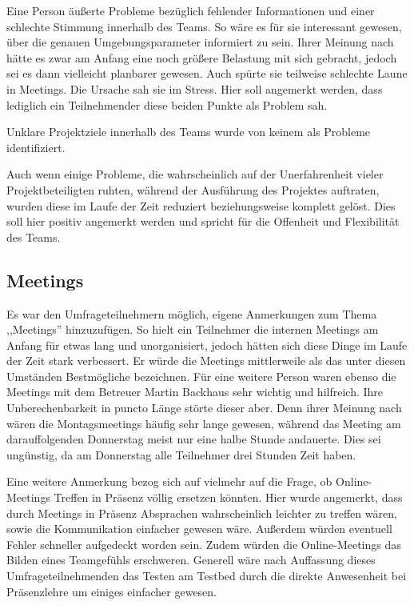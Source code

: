 \documentclass[../review_3.tex]{subfiles}
\begin{document}
Eine Person äußerte Probleme bezüglich fehlender Informationen und einer schlechte Stimmung innerhalb des Teams. So wäre es für sie interessant gewesen, über die genauen Umgebungsparameter informiert zu sein. Ihrer Meinung nach hätte es zwar am Anfang eine noch größere Belastung mit sich gebracht, jedoch sei es dann vielleicht planbarer gewesen. Auch spürte sie teilweise schlechte Laune in Meetings. Die Ursache sah sie im Stress. Hier soll angemerkt werden, dass lediglich ein Teilnehmender diese beiden Punkte als Problem sah.

Unklare Projektziele innerhalb des Teams wurde von keinem als Probleme identifiziert.

Auch wenn einige Probleme, die wahrscheinlich auf der Unerfahrenheit vieler Projektbeteiligten ruhten, während der Ausführung des Projektes auftraten, wurden diese im Laufe der Zeit reduziert beziehungsweise komplett gelöst. Dies soll hier positiv angemerkt werden und spricht für die Offenheit und Flexibilität des Teams.

\subsection{Meetings}

Es war den Umfrageteilnehmern möglich, eigene Anmerkungen zum Thema ,,Meetings'' hinzuzufügen.
So hielt ein Teilnehmer die internen Meetings am Anfang für etwas lang und unorganisiert, jedoch hätten sich diese Dinge im Laufe der Zeit  stark verbessert. Er würde die Meetings mittlerweile als das unter diesen Umständen Bestmögliche bezeichnen. Für eine weitere Person waren ebenso die Meetings mit dem Betreuer Martin Backhaus sehr wichtig und hilfreich. Ihre Unberechenbarkeit in puncto Länge störte dieser aber. Denn ihrer Meinung nach wären die Montagsmeetings häufig sehr lange gewesen, während das Meeting am darauffolgenden Donnerstag meist nur eine halbe Stunde andauerte. Dies sei ungünstig, da am Donnerstag alle Teilnehmer drei Stunden Zeit haben.

Eine weitere Anmerkung bezog sich auf vielmehr auf die Frage, ob Online-Meetings Treffen in Präsenz völlig ersetzen könnten. Hier wurde angemerkt, dass durch Meetings in Präsenz Absprachen wahrscheinlich leichter zu treffen wären, sowie die Kommunikation einfacher gewesen wäre. Außerdem würden eventuell Fehler schneller aufgedeckt worden sein. Zudem würden die Online-Meetings das Bilden eines Teamgefühls erschweren. Generell wäre nach Auffassung dieses Umfrageteilnehmenden das Testen am Testbed durch die direkte Anwesenheit bei Präsenzlehre um einiges einfacher gewesen.
\end{document}
